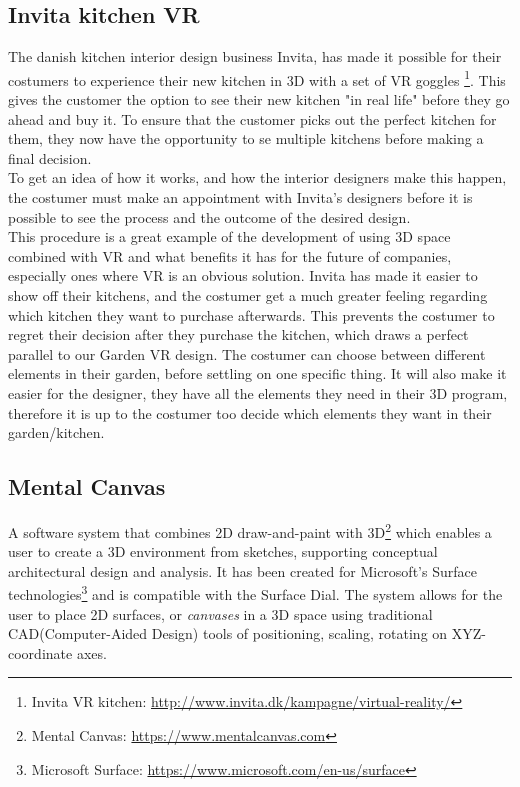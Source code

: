 \subsection{Invita kitchen VR}
The danish kitchen interior design business Invita, has made it possible for their costumers to experience their new kitchen in 3D with a set of VR goggles \footnote{Invita VR kitchen: \url{http://www.invita.dk/kampagne/virtual-reality/}}. This gives the customer the option to see their new kitchen "in real life" before they go ahead and buy it. To ensure that the customer picks out the perfect kitchen for them, they now have the opportunity to se multiple kitchens before making a final decision.\\
To get an idea of how it works, and how the interior designers make this happen, the costumer must make an appointment with Invita's designers before it is possible to see the process and the outcome of the desired design.\\
This procedure is a great example of the development of using 3D space combined with VR and what benefits it has for the future of companies, especially ones where VR is an obvious solution. Invita has made it easier to show off their kitchens, and the costumer get a much greater feeling regarding which kitchen they want to purchase afterwards. This prevents the costumer to regret their decision after they purchase the kitchen, which draws a perfect parallel to our Garden VR design. The costumer can choose between different elements in their garden, before settling on one specific thing. It will also make it easier for the designer, they have all the elements they need in their 3D program, therefore it is up to the costumer too decide which elements they want in their garden/kitchen.


\subsection{Mental Canvas}
A software system that combines 2D draw-and-paint with 3D\footnote{Mental Canvas: \url{https://www.mentalcanvas.com}} which enables a user to create a 3D environment from sketches, supporting conceptual architectural design and analysis. It has been created for Microsoft's Surface technologies\footnote{Microsoft Surface: \url{https://www.microsoft.com/en-us/surface}} and is compatible with the Surface Dial. The system allows for the user to place 2D surfaces, or \textit{canvases} in a 3D space using traditional CAD(Computer-Aided Design) tools of positioning, scaling, rotating on XYZ-coordinate axes.\cite{sotaMentalCanvas}

